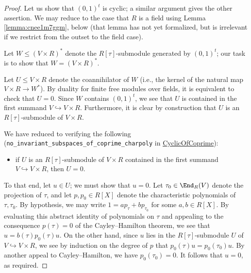 \documentclass[reqno]{amsart} 
\begin{document}
\begin{proof}
  Let us show that $(0,1)^t$ is cyclic; a similar argument gives the other assertion.  We may reduce to the case that $R$ is a field using Lemma \ref{lemma:cnee1m7ggm}, below (that lemma has not yet formalized, but is irrelevant if we restrict from the outset to the field case).

  Let $W \leq (V \times R)^*$ denote the $R[\tau]$-submodule generated by $(0,1)^t$; our task is to show that $W = (V \times R)^*$.

  Let $U \leq V \times R$ denote the coannihilator of $W$ (i.e., the kernel of the natural map $V \times R \rightarrow W^*$).  By duality for finite free modules over fields, it is equivalent to check that $U = 0$.  Since $W$ contains $(0,1)^t$, we see that $U$ is contained in the first summand $V \hookrightarrow V \times R$.  Furthermore, it is clear by construction that $U$ is an $R[\tau]$-submodule of $V \times R$.

  We have reduced to verifying the following (\verb|no_invariant_subspaces_of_coprime_charpoly| in \href{CyclicOfCoprime.lean}{CyclicOfCoprime}):
  \begin{itemize}
  \item if $U$ is an $R[\tau]$-submodule of $V \times R$ contained in the first summand $V \hookrightarrow V \times R$, then $U = 0$.
  \end{itemize}

  To that end, let $u \in U$; we must show that $u = 0$.  Let $\tau_0 \in \End_R(V)$ denote the projection of $\tau$, and let $p, p_0 \in R[X]$ denote the characteristic polynomials of $\tau, \tau_0$.  By hypothesis, we may write $1 = a p_\tau + b p_{\tau_0}$ for some $a, b \in R[X]$.  By evaluating this abstract identity of polynomials on $\tau$ and appealing to the consequence $p(\tau) = 0$ of the Cayley--Hamilton theorem, we see that $u = b(\tau) p_0(\tau) u$.  On the other hand, since $u$ lies in the $R[\tau]$-submodule $U$ of $V \hookrightarrow V \times R$, we see by induction on the degree of $p$ that $p_0(\tau) u = p_0(\tau_0) u$.  By another appeal to Cayley--Hamilton, we have $p_0(\tau_0) = 0$.  It follows that $u = 0$, as required.
\end{proof}
\end{document}
